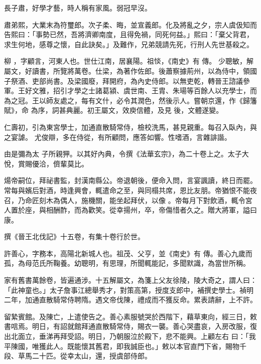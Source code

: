 \begin{pinyinscope}
 長子肅，好學才藝，時人稱有家風。弱冠早沒。



 肅弟熙，大業末為符璽郎。次子柔、晦，並宣義郎。化及將亂之夕，宗人虞伋知而告熙曰：「事勢已然，吾將濟卿南度，且得免禍，同死何益。」熙曰：「棄父背君，求生何地，感尊之懷，自此訣矣。」及難作，兄弟競請先死，行刑人先世基殺之。


柳
 ，字顧言，河東人也。世仕江南，居襄陽。祖惔，《南史》有
 傳。
 少聰敏，解屬文，好讀書，所覽將萬卷。仕梁，為著作佐郎。後蕭察據荊州，以為侍中，領國子祭酒、吏部尚書。及梁國廢，拜開府，為內史侍郎。以無吏乾，轉晉王諮議參軍。王好文雅，招引才學之士諸葛潁、虞世南、王胄、朱瑒等百餘人以充學士，而
 為之冠。王以師友處之，每有文什，必令其潤色，然後示人。嘗朝京還，作《歸籓賦》，命
 為序，詞甚典麗。初王屬文，效庾信體，及見
 後，文體遂變。


仁壽初，引為東宮學士，加通直散騎常侍，檢校洗馬，甚見親重。每召入臥內，與之宴謔。
 尤俊辯，多在侍從，有所顧問，應答如響。性嗜酒，言雜誹諧。



 由是彌為太
 子所親狎。以其好內典，令撰《法華玄宗》，為二十卷上之。太子大悅，賞賜優洽，儕輩莫比。


煬帝嗣位，拜祕書監，封漢南縣公。帝退朝後，便命入問，言宴諷讀，終日而罷。常每與嬪后對酒，時逢興會，輒遣命之至，與同榻共席，恩比友朋。帝猶恨不能夜召，乃命匠刻木為偶人，施機關，能坐起拜伏，以像
 。帝每月下對飲酒，輒令宮人置於座，與相酬酢，而為歡笑。從幸揚州，卒，帝傷惜者久之。贈大將軍，謚曰康。


 撰《晉王北伐記》十五卷，有集十卷行於世。



 許善心，字務本，高陽北新城人也。祖茂、父亨，並《南史》有
 傳。善心九歲而孤，為母范氏所鞠養。幼聰明，有思理，所聞輒能記，多聞默識，為當世所稱。



 家有舊書萬餘卷，皆遍通涉。十五解屬文，為箋上父友徐陵，陵大奇之，謂人曰：「此神童也。」太子詹事江總舉秀才，對策高第，授度支郎中，補撰史學士。禎明二年，加通直散騎常侍聘隋。遇文帝伐陳，禮成而不獲反命。累表請辭，上不許。



 留縶賓館。及陳亡，上遣使告之。善心素服號哭於西階下，藉草東向，經三日，敕書唁焉。明日，有詔就館拜通直散騎常侍，賜衣一襲。善心哭盡哀，入房改服，復出北面立，垂涕再拜受詔。明日，乃朝服泣於殿下，悲不能興。上顧左右
 曰：「我平陳國，唯獲此人。既能懷其舊君，即我誠臣也。」敕以本官直門下省，賜物千段、草馬二十匹。從幸太山，還，授虞部侍郎。




\end{pinyinscope}
